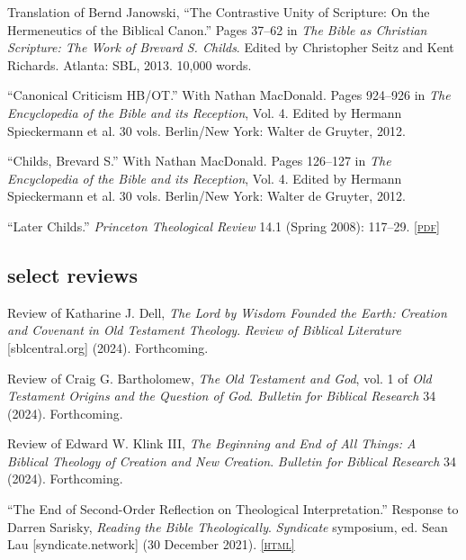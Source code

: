 \documentclass[11pt]{article}
\newcommand{\html}[1]{\href{#1}{\footnotesize\textsc{[html]}}}
\newcommand{\pdf}[1]{\href{#1}{\footnotesize\textsc{[pdf]}}}
\newcommand{\doi}[1]{\href{https://doi.org/#1}{\footnotesize\textsc{[doi]}}}
\newcommand{\years}[1]{\marginnote{\footnotesize #1}}
\begin{document}
\years{2013}
Translation of Bernd Janowski, ``The Contrastive Unity of Scripture: On
the Hermeneutics of the Biblical Canon.'' Pages 37--62 in \emph{The
Bible as Christian Scripture: The Work of Brevard S. Childs}. Edited by
Christopher Seitz and Kent Richards. Atlanta: SBL, 2013. 10,000 words.

\years{2012}%
``Canonical Criticism HB/OT.'' With Nathan MacDonald. Pages 924–926 in
\emph{The Encyclopedia of the Bible and its Reception}, Vol. 4. Edited
by Hermann Spieckermann et al. 30 vols. Berlin/New York: Walter de
Gruyter, 2012.

\years{2012}
``Childs, Brevard S.'' With Nathan MacDonald. Pages 126–127 in \emph{The
Encyclopedia of the Bible and its Reception}, Vol. 4. Edited by Hermann
Spieckermann et al. 30 vols. Berlin/New York: Walter de Gruyter, 2012.

\years{2008}
``Later Childs.'' \emph{Princeton Theological Review} 14.1 (Spring 2008):
117--29.
\pdf{http://ptsptr.wpengine.com/wp-content/uploads/2016/11/38.pdf}


\subsection*{select reviews}

\years{2024}
Review of Katharine J. Dell, \emph{The Lord by Wisdom Founded the Earth: Creation and Covenant in Old Testament Theology}. \emph{Review of Biblical Literature} [sblcentral.org] (2024). Forthcoming.

\years{2024}
Review of Craig G. Bartholomew, \emph{The Old Testament and God}, vol. 1 of \emph{Old Testament Origins and the Question of God}. \emph{Bulletin for Biblical Research} 34 (2024). Forthcoming.

\years{2024}
Review of Edward W. Klink III, \emph{The Beginning and End of All Things: A Biblical Theology of Creation and New Creation}. \emph{Bulletin for Biblical Research} 34 (2024). Forthcoming.

\years{2021}
“The End of Second-Order Reflection on Theological Interpretation.”
Response to Darren Sarisky, \emph{Reading the Bible Theologically}.
\emph{Syndicate} symposium, ed. Sean Lau [syndicate.network] (30 December 2021). \html{https://syndicate.network/symposia/theology/reading-the-bible-theologically/}
\end{document}
